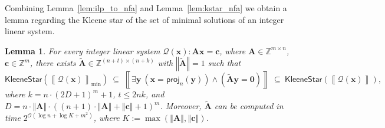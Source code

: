 \documentclass[10pt,a4paper]{article}
\newtheorem{lemma}[theorem]{Lemma}
\theoremstyle{definition}
\theoremstyle{remark}
\newcommand{\cO}{\mathcal{O}}
\newcommand{\cQ}{\mathcal{Q}}
\newcommand{\bbZ}{\mathbb{Z}}
\newcommand{\bfA}{\mathbf{A}}
\newcommand{\bfAtilde}{\tilde{\mathbf{A}}}
\newcommand{\bfc}{\mathbf{c}}
\newcommand{\bfx}{\mathbf{x}}
\newcommand{\bfy}{\mathbf{y}}
\newcommand{\bfzero}{\mathbf{0}}
\newcommand{\norm}[1]        {\left\Vert #1 \right\Vert}
\newcommand{\projp}[2]     {\mathsf{proj}_{ #1 }\left( #2 \right)}
\newcommand{\kstar}[1] {\mathsf{KleeneStar}\left( #1 \right)}
\newcommand{\sol}[1] {\left\llbracket #1 \right\rrbracket}
\newcommand{\solmin}[1] {\left\llbracket #1 \right\rrbracket_\text{min}}
\newcommand{\bigO}[1] {{\cO\left( #1 \right)}}
\begin{document}
Combining Lemma~\ref{lem:ilp_to_nfa} and Lemma~\ref{lem:kstar_nfa} we obtain
a lemma regarding the Kleene star of the set of minimal solutions of an integer linear system.
\begin{lemma}\label{lemma:kleene_minimal}
    For every integer linear system $\cQ(\bfx): \bfA \bfx = \bfc$,
    where $\bfA \in \bbZ^{m \times n}$, $\bfc \in \bbZ^{m}$,
    there exists $\bfAtilde \in \bbZ^{(n+t) \times (n+k)}$ with $\norm{\bfAtilde} = 1$
    such that
    \begin{equation*}
        \kstar{\solmin{\cQ(\bfx)}}
        \ \subseteq\ 
        \sol{\exists \bfy\ (\bfx = \projp{n}{\bfy}) \land (\tilde{\bfA} \bfy = \bfzero)}
        \ \subseteq\ 
        \kstar{\sol{\cQ(\bfx)}},
    \end{equation*}
    where 
    $k = n\cdot(2D+1)^{m} + 1$,
    $t \le 2nk$, and
    $D = n \cdot \norm{\bfA} \cdot \left((n+1)\cdot \norm{\bfA} + \norm{\bfc} + 1\right)^{m}$.
    Moreover, $\bfAtilde$ can be computed in time $2^\bigO{\log n + \log K + m^2}$,
    where $K := \max\left(\norm{\bfA}, \norm{\bfc}\right)$.
\end{lemma}
\end{document}
